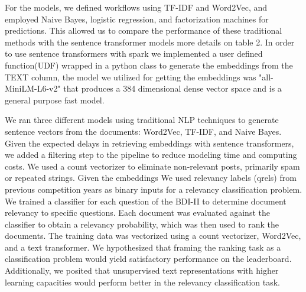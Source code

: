 \documentclass[]{style/ceurart}
\begin{document}
For the models, we defined workflows using TF-IDF and Word2Vec, and employed Naive Bayes, logistic regression, and factorization machines for predictions. This allowed us to compare the performance of these traditional methods with the sentence transformer models \cite{reimers_sentence-bert_2019} more details on table 2.
In order to use sentence transformers with spark we implemented a user defined function(UDF) wrapped in a python class to generate the embeddings from the TEXT column, the model we utilized for getting the embeddings was "all-MiniLM-L6-v2" that produces a 384 dimensional dense vector space and is a general purpose fast model\cite{noauthor_sentence-transformersall-minilm-l6-v2_nodate}.

We ran three different models using traditional NLP techniques to generate sentence vectors from the documents: Word2Vec, TF-IDF, and Naive Bayes. Given the expected delays in retrieving embeddings with sentence transformers, we added a filtering step to the pipeline to reduce modeling time and computing costs. We used a count vectorizer to eliminate non-relevant posts, primarily spam or repeated strings. Given the embeddings We used relevancy labels (qrels) from previous competition years as binary inputs for a relevancy classification problem. We trained a classifier for each question of the BDI-II to determine document relevancy to specific questions. Each document was evaluated against the classifier to obtain a relevancy probability, which was then used to rank the documents. The training data was vectorized using a count vectorizer, Word2Vec, and a text transformer. We hypothesized that framing the ranking task as a classification problem would yield satisfactory performance on the leaderboard. Additionally, we posited that unsupervised text representations with higher learning capacities would perform better in the relevancy classification task.
\end{document}
